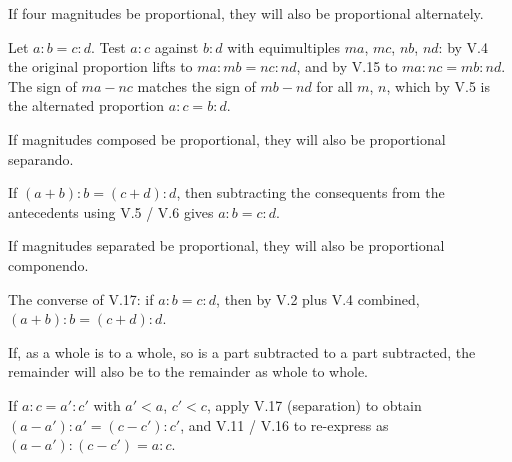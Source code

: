 \begin{claim}
\label{prop:V.16}
If four magnitudes be proportional, they will also be proportional
alternately.
\end{claim}
\begin{evidence}[Proof of V.16]
\label{ev:V.16}
Let $a : b = c : d$.  Test $a : c$ against $b : d$ with equimultiples
$ma$, $mc$, $nb$, $nd$: by V.4 the original proportion lifts to $ma :
mb = nc : nd$, and by V.15 to $ma : nc = mb : nd$.  The sign of $ma -
nc$ matches the sign of $mb - nd$ for all $m$, $n$, which by V.5 is
the alternated proportion $a : c = b : d$.
\end{evidence}

\begin{claim}
\label{prop:V.17}
If magnitudes composed be proportional, they will also be proportional
separando.
\end{claim}
\begin{evidence}[Proof of V.17]
\label{ev:V.17}
If $(a + b) : b = (c + d) : d$, then subtracting the consequents from
the antecedents using V.5 / V.6 gives $a : b = c : d$.
\end{evidence}

\begin{claim}
\label{prop:V.18}
If magnitudes separated be proportional, they will also be
proportional componendo.
\end{claim}
\begin{evidence}[Proof of V.18]
\label{ev:V.18}
The converse of V.17: if $a : b = c : d$, then by V.2 plus V.4
combined, $(a + b) : b = (c + d) : d$.
\end{evidence}

\begin{claim}
\label{prop:V.19}
If, as a whole is to a whole, so is a part subtracted to a part
subtracted, the remainder will also be to the remainder as whole to
whole.
\end{claim}
\begin{evidence}[Proof of V.19]
\label{ev:V.19}
If $a : c = a' : c'$ with $a' < a$, $c' < c$, apply V.17 (separation)
to obtain $(a - a') : a' = (c - c') : c'$, and V.11 / V.16 to
re-express as $(a - a') : (c - c') = a : c$.
\end{evidence}

